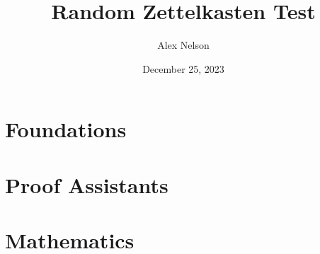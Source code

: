 \documentclass[dvipsnames,HTML]{amsbook}
\title{Random Zettelkasten Test}
\author{Alex Nelson}
\date{December 25, 2023}
\begin{document}
\frontmatter
\maketitle
\tableofcontents
\listofpuzzles

\mainmatter
\vfill\eject

\part{Foundations}










\part{Proof Assistants}







\part{Mathematics}





\backmatter
\appendix


\unappendix
\nocite{*}

\end{document}
